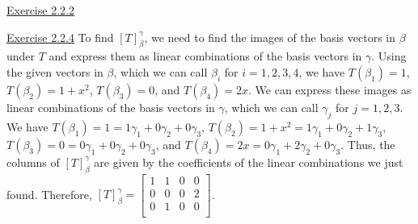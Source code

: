 \documentclass{exam}
\begin{document}
\underline{Exercise 2.2.2}
\newline
\newline
{}

\underline{Exercise 2.2.4}
\newline
\newline
To find $[T]_{\beta}^{\gamma}$, we need to find the images of the basis vectors in $\beta$ under $T$ and express them as linear combinations of the basis vectors in $\gamma$. Using the given vectors in $\beta$, which we can call $\beta_i$ for $i=1,2,3,4$, we have $T(\beta_1) = 1$, $T(\beta_2) = 1+x^2$, $T(\beta_3) = 0$, and $T(\beta_4) = 2x$. We can express these images as linear combinations of the basis vectors in $\gamma$, which we can call $\gamma_j$ for $j=1,2,3$. We have $T(\beta_1) = 1 = 1\gamma_1 + 0\gamma_2 + 0\gamma_3$, $T(\beta_2) = 1+x^2 = 1\gamma_1 + 0\gamma_2 + 1\gamma_3$, $T(\beta_3) = 0 = 0\gamma_1 + 0\gamma_2 + 0\gamma_3$, and $T(\beta_4) = 2x = 0\gamma_1 + 2\gamma_2 + 0\gamma_3$. Thus, the columns of $[T]_{\beta}^{\gamma}$ are given by the coefficients of the linear combinations we just found. Therefore, $[T]_{\beta}^{\gamma} = \begin{bmatrix}
        1 & 1 & 0 & 0 \\
        0 & 0 & 0 & 2 \\
        0 & 1 & 0 & 0 \\
        \end{bmatrix}$.
\newline
\end{document}

